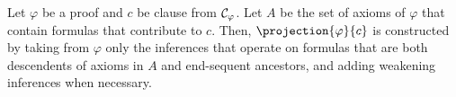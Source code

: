 

\begin{definition} %
\label{definition:OProjection}
Let $\varphi$ be a proof and $c$ be clause from $\mathcal{C}_{\varphi}$. Let $A$ be the set of axioms of $\varphi$ that contain formulas that contribute to $c$. Then, $\projection{\varphi}{c}$ is constructed by taking from $\varphi$ only the inferences that operate on formulas that are both descendents of axioms in $A$ and end-sequent ancestors, and adding weakening inferences when necessary.
\end{definition}

